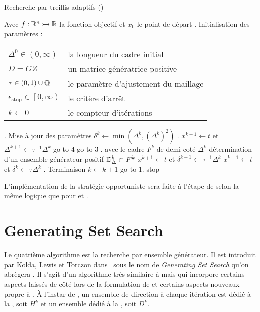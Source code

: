 \begin{algorithm}[H]
	\caption{\textsf{Recherche par treillis adaptifs} (\MADS)}
	\label{alg1}
	\begin{algorithmic}
		\STATE Avec $f:\mathbb{R}^n \rightarrowtail \mathbb{R}$ la fonction objectif et $x_0$ le point de départ
		. \textsf{Initialisation des paramètres} : 
		\bindent
		\STATE\begin{flushleft}
			\begin{tabular}{l l}
				$\Delta^0 \in (0,\infty)$ & la longueur du cadre initial\\
				$D=GZ$ & un matrice génératrice positive\\
				$\tau \in (0,1) \cup \mathbb{Q}$ & le paramètre d'ajustement du maillage\\
				$\epsilon_{\text{stop}} \in \left[ 0,\infty \right) $ & le critère d'arrêt\\
				$k \leftarrow 0$ & le compteur d'itérations\\
			\end{tabular}
		\end{flushleft}
		\eindent
		. \textsf{Mise à jour des paramètres}
		\bindent
		\STATE $\delta^k \leftarrow \min(\Delta^k,(\Delta^k)^2)$
		\eindent
		. \SEARCH
		\bindent
		\STATE $x^{k+1} \leftarrow t$ et $\Delta^{k+1} \leftarrow \tau ^{-1}\Delta^k$
		\STATE go to 4
		\ELSE
		\STATE go to 3
		\ENDIF
		\eindent
		. \POLL
		\bindent
		\STATE avec le cadre $F^k$ de demi-coté $\Delta^k$
		\STATE détermination d'un ensemble générateur positif $\mathbb{D}^k_\Delta \subset F^k$
		\STATE $x^{k+1} \leftarrow t$ et $\delta^{k+1} \leftarrow \tau ^{-1}\Delta^k$
		\ELSE
		\STATE $x^{k+1} \leftarrow t$ et $\delta^{k} \leftarrow \tau\Delta^k$
		\ENDIF
		\eindent
		. \textsf{Terminaison}
		\bindent
		\STATE $k\leftarrow k+1$
		\STATE go to 1.
		\ELSE
		\STATE stop
		\ENDIF
		\eindent
	\end{algorithmic}
\end{algorithm}
L'implémentation de la stratégie opportuniste sera faite à l'étape de \POLL selon la même logique que pour \CS et \GPS. 
\section{Generating Set Search}
Le quatrième algorithme est la recherche par ensemble générateur. Il est introduit par Kolda, Lewis et Torczon dans~\cite{KoLeTo03a} sous le nom de \textit{Generating Set Search} qu'on abrègera \GSS. Il s'agit d'un algorithme très similaire à \GPS mais qui incorpore certains aspects laissés de côté lors de la formulation de \GPS et certains aspects nouveaux propre à \GSS. À l'instar de \GSS, un ensemble de direction à chaque itération est dédié à la \SEARCH, soit $H^k$ et un ensemble dédié à la \POLL, soit $D^k$.

